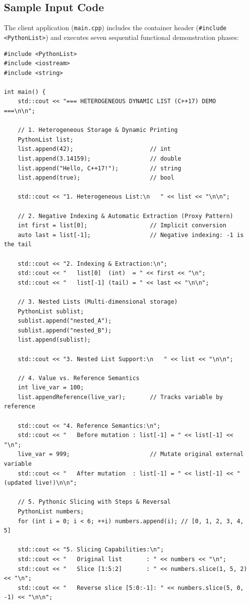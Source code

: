 \documentclass[12pt,a4paper]{report}
\begin{document}
\subsection{Sample Input Code}
The client application (\texttt{main.cpp}) includes the container header (\texttt{\#include <PythonList>}) and executes seven sequential functional demonstration phases:

\begin{lstlisting}[style=cppsnippet]
#include <PythonList>
#include <iostream>
#include <string>

int main() {
    std::cout << "=== HETEROGENEOUS DYNAMIC LIST (C++17) DEMO ===\n\n";

    // 1. Heterogeneous Storage & Dynamic Printing
    PythonList list;
    list.append(42);                      // int
    list.append(3.14159);                 // double
    list.append("Hello, C++17!");         // string
    list.append(true);                    // bool

    std::cout << "1. Heterogeneous List:\n   " << list << "\n\n";

    // 2. Negative Indexing & Automatic Extraction (Proxy Pattern)
    int first = list[0];                  // Implicit conversion
    auto last = list[-1];                 // Negative indexing: -1 is the tail

    std::cout << "2. Indexing & Extraction:\n";
    std::cout << "   list[0]  (int)  = " << first << "\n";
    std::cout << "   list[-1] (tail) = " << last << "\n\n";

    // 3. Nested Lists (Multi-dimensional storage)
    PythonList sublist;
    sublist.append("nested_A");
    sublist.append("nested_B");
    list.append(sublist);

    std::cout << "3. Nested List Support:\n   " << list << "\n\n";

    // 4. Value vs. Reference Semantics
    int live_var = 100;
    list.appendReference(live_var);       // Tracks variable by reference

    std::cout << "4. Reference Semantics:\n";
    std::cout << "   Before mutation : list[-1] = " << list[-1] << "\n";
    live_var = 999;                       // Mutate original external variable
    std::cout << "   After mutation  : list[-1] = " << list[-1] << " (updated live!)\n\n";

    // 5. Pythonic Slicing with Steps & Reversal
    PythonList numbers;
    for (int i = 0; i < 6; ++i) numbers.append(i); // [0, 1, 2, 3, 4, 5]

    std::cout << "5. Slicing Capabilities:\n";
    std::cout << "   Original list       : " << numbers << "\n";
    std::cout << "   Slice [1:5:2]       : " << numbers.slice(1, 5, 2) << "\n";
    std::cout << "   Reverse slice [5:0:-1]: " << numbers.slice(5, 0, -1) << "\n\n";


\end{lstlisting}
\end{document}
